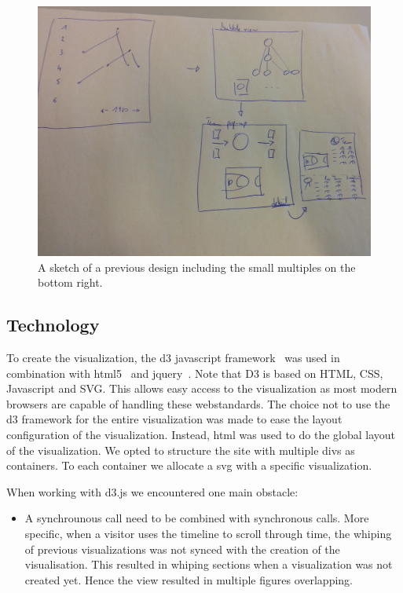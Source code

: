 \documentclass[]{sigchi}
\begin{document}
\begin{figure}
\centering
  \includegraphics[width=1.0\columnwidth]{figures/smallmultsketch}
  \caption{A sketch of a previous design including the small multiples on the
  bottom right.}
  \label{fig:smallmultsktech}
\end{figure}

\subsection{Technology}
To create the visualization, the d3 javascript framework~\cite{d3} was used in
combination with html5~\cite{html5} and jquery~\cite{jquery}. Note that D3 is
based on HTML, CSS, Javascript and SVG. This allows easy access to the
visualization as most modern browsers are capable of handling these
webstandards. The choice not to use the d3 framework for the entire
visualization was made to ease the layout configuration of the visualization.
Instead, html was used to do the global layout of the visualization. We opted to
structure the site with multiple divs as containers. To each container we
allocate a svg with a specific visualization.

When working with d3.js we encountered one main obstacle:
\begin{itemize}
        \item A synchrounous call need to be combined with synchronous calls.
            More specific, when a visitor uses the timeline to scroll through
            time, the whiping of previous visualizations was not synced with the
            creation of the visualisation. This resulted in whiping sections
            when a visualization was not created yet. Hence the view resulted in
            multiple figures overlapping.
\end{itemize}
\end{document}
